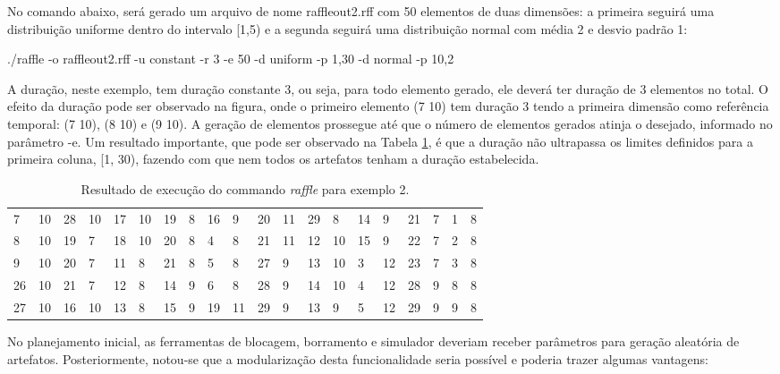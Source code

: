 No comando abaixo, será gerado um arquivo de nome raffleout2.rff com 50 elementos de duas dimensões: a primeira seguirá uma distribuição uniforme dentro do intervalo [1,5) e a segunda seguirá uma distribuição normal com média 2 e desvio padrão 1:

./raffle -o raffleout2.rff -u constant -r 3 -e 50 -d uniform -p 1,30 -d normal -p 10,2

A duração, neste exemplo, tem duração constante 3, ou seja, para todo elemento gerado, ele deverá ter duração de 3 elementos no total. O efeito da duração pode ser observado na figura, onde o primeiro elemento (7 10) tem duração 3 tendo a primeira dimensão como referência temporal: (7 10), (8 10) e (9 10). A geração de elementos prossegue até que o número de elementos gerados atinja o desejado, informado no parâmetro -e. Um resultado importante, que pode ser observado na Tabela \ref{tab:raffleresult2}, é que a duração não ultrapassa os limites definidos para a primeira coluna, [1, 30), fazendo com que nem todos os artefatos tenham a duração estabelecida.

\begin{table}[!h]
	\centering
	\caption{Resultado de execução do commando \emph{raffle} para exemplo 2.}
	\label{tab:raffleresult2}
	\begin{tabular}{|ll|ll|ll|ll|ll|ll|ll|ll|ll|ll|}
		\hline
		 7 & 10 & 28 & 10 & 17 & 10 & 19 & 8 & 16 &  9 & 20 & 11 & 29 &  8 & 14 &  9 & 21 & 7 & 1 & 8 \\
         8 & 10 & 19 &  7 & 18 & 10 & 20 & 8 &  4 &  8 & 21 & 11 & 12 & 10 & 15 &  9 & 22 & 7 & 2 & 8 \\
         9 & 10 & 20 &  7 & 11 &  8 & 21 & 8 &  5 &  8 & 27 &  9 & 13 & 10 &  3 & 12 & 23 & 7 & 3 & 8 \\
        26 & 10 & 21 &  7 & 12 &  8 & 14 & 9 &  6 &  8 & 28 &  9 & 14 & 10 &  4 & 12 & 28 & 9 & 8 & 8 \\
        27 & 10 & 16 & 10 & 13 &  8 & 15 & 9 & 19 & 11 & 29 &  9 & 13 &  9 &  5 & 12 & 29 & 9 & 9 & 8 \\
		\hline
	\end{tabular}
\end{table}

No planejamento inicial, as ferramentas de blocagem, borramento e simulador deveriam receber parâmetros para geração aleatória de artefatos. Posteriormente, notou-se que a modularização desta funcionalidade seria possível e poderia trazer algumas vantagens:

